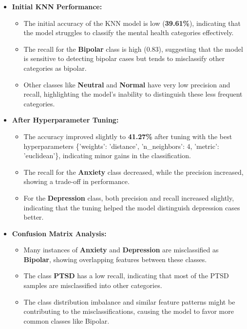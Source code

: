 \begin{itemize}
    \item \textbf{Initial KNN Performance:}
    \begin{itemize}
        \item The initial accuracy of the KNN model is low (\textbf{39.61\%}), indicating that the model struggles to classify the mental health categories effectively.
        \item The recall for the \textbf{Bipolar} class is high (0.83), suggesting that the model is sensitive to detecting bipolar cases but tends to misclassify other categories as bipolar.
        \item Other classes like \textbf{Neutral} and \textbf{Normal} have very low precision and recall, highlighting the model’s inability to distinguish these less frequent categories.
    \end{itemize}

    \item \textbf{After Hyperparameter Tuning:}
    \begin{itemize}
        \item The accuracy improved slightly to \textbf{41.27\%} after tuning with the best hyperparameters \{'weights': 'distance', 'n\_neighbors': 4, 'metric': 'euclidean'\}, indicating minor gains in the classification.
        \item The recall for the \textbf{Anxiety} class decreased, while the precision increased, showing a trade-off in performance.
        \item For the \textbf{Depression} class, both precision and recall increased slightly, indicating that the tuning helped the model distinguish depression cases better.
    \end{itemize}

    \item \textbf{Confusion Matrix Analysis:}
    \begin{itemize}
        \item Many instances of \textbf{Anxiety} and \textbf{Depression} are misclassified as \textbf{Bipolar}, showing overlapping features between these classes.
        \item The class \textbf{PTSD} has a low recall, indicating that most of the PTSD samples are misclassified into other categories.
        \item The class distribution imbalance and similar feature patterns might be contributing to the misclassifications, causing the model to favor more common classes like Bipolar.
    \end{itemize}
\end{itemize}

